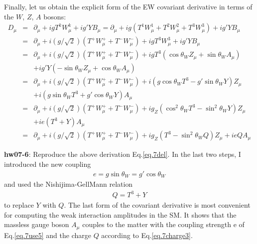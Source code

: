 \documentclass[12pt]{article}
\def\del{{\partial}}
\begin{document}
  Finally, let us obtain the explicit form of the EW covariant
  derivative in terms of the $W$, $Z$, $A$ bosons:
\begin{eqnarray}
  D_\mu
  &=&\del_\mu +i g T^k W^k_\mu + i g' Y B_\mu
  =\del_\mu +ig(T^1W^1_\mu+T^2W^2_\mu+T^3W^3_\mu) +ig'YB_\mu \nonumber \\
  &=&\del_\mu +i(g/\sqrt2)(T^+W^+_\mu + T^-W^-_\mu)
            +igT^3 W^3_\mu
            +ig'Y  B_\mu \nonumber \\
  &=&\del_\mu +i(g/\sqrt2)(T^+W^+_\mu + T^-W^-_\mu)
            +igT^3 ( \cos\theta_W Z_\mu + \sin\theta_W A_\mu) \nonumber \\
           &&+ig'Y  (-\sin\theta_W Z_\mu + \cos\theta_W A_\mu)\nonumber \\
  &=&\del_\mu +i(g/\sqrt2)(T^+W^+_\mu + T^-W^-_\mu)
            +i(g\cos\theta_W T^3 -g'\sin\theta_W Y) Z_\mu\nonumber \\
            &&+i(g\sin\theta_W T^3 +g'\cos\theta_W Y) A_\mu \nonumber \\
  &=&\del_\mu +i(g/\sqrt2)(T^+W^+_\mu + T^-W^-_\mu)
            +ig_Z(\cos^2\theta_W T^3 -\sin^2\theta_W Y) Z_\mu
            \nonumber \\ &&+ie(T^3 + Y) A_\mu \nonumber \\
  &=&\del_\mu +i(g/\sqrt2)(T^+W^+_\mu + T^-W^-_\mu)
            +ig_Z(T^3 -\sin^2\theta_W Q) Z_\mu
            +ieQ A_\mu \label{eq.7del}
\end{eqnarray}

{\bf hw07-6}: Reproduce the above derivation Eq.\ref{eq.7del}.
  In the last two steps, I introduced the new coupling
\begin{eqnarray}
  e = g\sin\theta_W = g'\cos\theta_W \label{eq.7e}
\end{eqnarray}
  and used the Nishijima-GellMann relation
  \begin{eqnarray}
    Q = T^3 + Y \label{eq.7charge3}
  \end{eqnarray}
   to replace $Y$ with $Q$. The last form of the covariant derivative
  is most convenient for computing the weak interaction amplitudes
  in the SM.  It shows that the massless gauge boson $A_\mu$ couples
  to the matter with the coupling strength e of Eq.\ref{eq.7use5} and the
  charge $Q$ according to Eq.\ref{eq.7charge3}.
\end{document}
